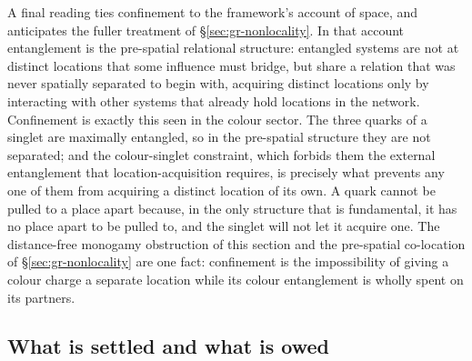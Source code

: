 A final reading ties confinement to the framework's account of space, and anticipates the fuller
treatment of \S\ref{sec:gr-nonlocality}. In that account entanglement is the pre-spatial relational
structure: entangled systems are not at distinct locations that some influence must bridge, but share
a relation that was never spatially separated to begin with, acquiring distinct locations only by
interacting with other systems that already hold locations in the network. Confinement is exactly
this seen in the colour sector. The three quarks of a singlet are maximally entangled, so in the
pre-spatial structure they are not separated; and the colour-singlet constraint, which forbids them
the external entanglement that location-acquisition requires, is precisely what prevents any one of
them from acquiring a distinct location of its own. A quark cannot be pulled to a place apart because,
in the only structure that is fundamental, it has no place apart to be pulled to, and the singlet will
not let it acquire one. The distance-free monogamy obstruction of this section and the pre-spatial
co-location of \S\ref{sec:gr-nonlocality} are one fact: confinement is the impossibility of giving a
colour charge a separate location while its colour entanglement is wholly spent on its partners.

\subsection{What is settled and what is owed}


